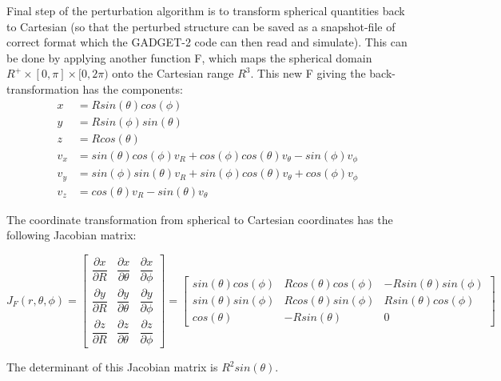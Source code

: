Final step of the perturbation algorithm is to transform spherical quantities back to Cartesian (so that the perturbed structure can be saved as a snapshot-file of correct format which the GADGET-2 code can then read and simulate). This can be done by applying another function F, which maps the spherical domain $R^+ \times [0,\pi] \times [0,2\pi)$ onto the Cartesian range $R^3$. This new F giving the back-transformation has the components: \\ 

\begin{align*}
x   &= Rsin(\theta)cos(\phi) \\
y   &= Rsin(\phi)sin(\theta) \\
z   &= Rcos(\theta) \\
v_x &= sin(\theta)cos(\phi)v_R + cos(\phi)cos(\theta)v_{\theta} - sin(\phi)v_{\phi} \\
v_y &= sin(\phi)sin(\theta)v_R + sin(\phi)cos(\theta)v_{\theta} + cos(\phi)v_{\phi} \\
v_z &= cos(\theta)v_R - sin(\theta)v_{\theta}
\end{align*}

The coordinate transformation from spherical to Cartesian coordinates has the following Jacobian matrix:

\begingroup
\renewcommand*{\arraystretch}{2.5}
\begin{equation}
J_F(r,\theta,\phi) = 
\begin{bmatrix}
\dfrac{\partial x}{\partial R} & \dfrac{\partial x}{\partial \theta} & \dfrac{\partial x}{\partial \phi} \\ 
\dfrac{\partial y}{\partial R} & \dfrac{\partial y}{\partial \theta} & \dfrac{\partial y}{\partial \phi} \\ 
\dfrac{\partial z}{\partial R} & \dfrac{\partial z}{\partial \theta} & \dfrac{\partial z}{\partial \phi} 
\end{bmatrix} =
\begin{bmatrix}
sin(\theta)cos(\phi) &  Rcos(\theta)cos(\phi)  & -Rsin(\theta)sin(\phi)  \\ 
sin(\theta)sin(\phi) &  Rcos(\theta)sin(\phi)  &  Rsin(\theta)cos(\phi)  \\ 
cos(\theta)          & -Rsin(\theta)  &  0 
\end{bmatrix}
\end{equation}
\endgroup

The determinant of this Jacobian matrix is $R^2sin(\theta)$.

